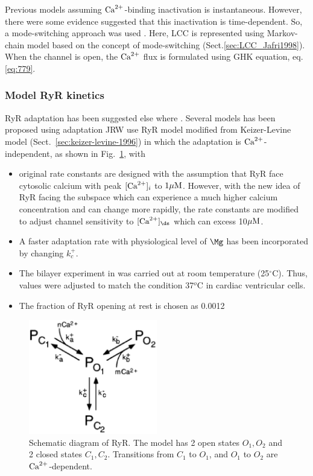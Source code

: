 Previous models assuming ${\text{Ca}^{2+}}$-binding inactivation is instantaneous. However,
there were some evidence suggested that this inactivation is time-dependent. So,
a mode-switching approach was used \citep{imredy1994mcs}. Here, LCC is
represented using Markov-chain model based on the concept of mode-switching
(Sect.\ref{sec:LCC_Jafri1998}). When the channel is open, the ${\text{Ca}^{2+}}$ flux is
formulated using GHK equation, eq.\ref{eq:779}.

\subsubsection{Model RyR kinetics}
\label{sec:model-ryr-kinetics}

RyR adaptation has been suggested else where \citep{gyorke1993ryr}. Several
models has been proposed using adaptation \citep{cheng1995, keizer1996rra}
 JRW use RyR model modified from Keizer-Levine model
(Sect.~\ref{sec:keizer-levine-1996}) in which the adaptation is
${\text{Ca}^{2+}}$-independent, as shown in Fig.~\ref{fig:Keizer_Levine_RyR}, with
\begin{itemize}
\item original rate constants are designed with the assumption that
  RyR face cytosolic calcium with peak $[{\text{Ca}^{2+}}]_i$ to $1{\mu\text{M}}$. However,
  with the new idea of RyR facing the subspace which can experience a
  much higher calcium concentration and can change more rapidly, the
  rate constants are modified to adjust channel sensitivity to
  $[\Ca]_\ds$ which can excess 10${\mu\text{M}}$.

\item A faster adaptation rate with physiological level of $\Mg$
\citep{valdivia1995} has been incorporated by changing $k^+_c$. 

\item The bilayer experiment in \citep{gyorke1993ryr} was carried out at room
temperature (25$^\circ$C). Thus, values were adjusted to match the condition
37$^o$C in cardiac ventricular cells. 

\item The fraction of RyR opening at rest is chosen as 0.0012
\end{itemize}


\begin{figure}[hbt]
  \centerline{\includegraphics[height=5cm,
    angle=0]{./images/KeizerLevine_model.eps}}
  \caption{Schematic diagram of RyR. The model has 2 open states $O_1,
    O_2$ and 2 closed states $C_1, C_2$. Transitions from $C_1$ to
    $O_1$, and $O_1$ to $O_2$ are ${\text{Ca}^{2+}}$-dependent.}
\label{fig:Keizer_Levine_RyR}
\end{figure}



